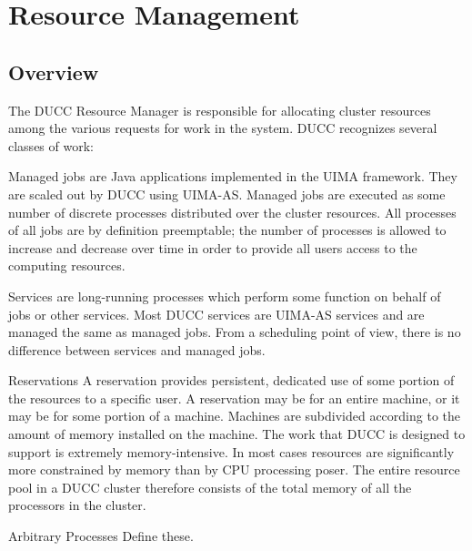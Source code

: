 \ifpdf
\else
{}
\fi
\chapter{Resource Management}
\label{chap:rm}
    \section{Overview}

    The DUCC Resource Manager is responsible for allocating cluster resources among the various 
    requests for work in the system. DUCC recognizes several classes of work: 

    \begin{description}
        \item[Managed Jobs]
            Managed jobs are Java applications implemented in the UIMA framework. 
            They are scaled out by DUCC using UIMA-AS. Managed jobs are executed as some 
            number of discrete processes distributed over the cluster resources. All processes of all jobs 
            are by definition preemptable; the number of processes is allowed to increase and decrease 
            over time in order to provide all users access to the computing resources. 
        \item[Services]
            Services are long-running processes which perform some function on behalf of 
            jobs or other services. Most DUCC services are UIMA-AS services and are managed the 
            same as managed jobs. From a scheduling point of view, there is no difference between 
            services and managed jobs. 

        \item{Reservations}
            A reservation provides persistent, dedicated use of some portion of the 
            resources to a specific user. A reservation may be for an entire machine, or it may be for 
            some portion of a machine. Machines are subdivided according to the amount of memory 
            installed on the machine. 
            The work that DUCC is designed to support is extremely memory-intensive. In most cases 
            resources are significantly more constrained by memory than by CPU processing poser. The entire 
            resource pool in a DUCC cluster therefore consists of the total memory of all the processors in the           
            cluster. 

        \item{Arbitrary Processes}
            \todo Define these.
      \end{description}
          
